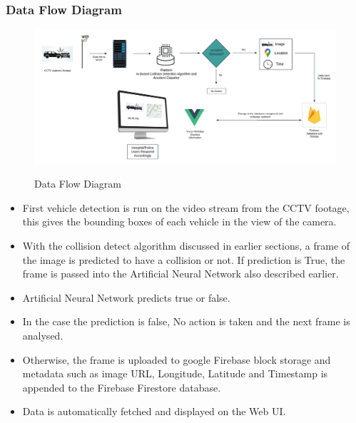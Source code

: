 \documentclass[ 12pt,a4paper,twocolumn,fleqn]{article}
\begin{document}
\begin{adjustwidth}{3.5em}{0pt}
\hspace{0.2cm}

\subsubsection{Data Flow Diagram}
\begin{figure}[H]
\begin{center}
    \hspace*{0.4in}
    \includegraphics[scale=0.3]{media/arch.png}
    \centering
    \\
  \caption{ Data Flow Diagram}
\end{center}
\end{figure}

\begin{itemize}
    \item First vehicle detection is run on the video stream from the CCTV footage, this gives the bounding boxes of each vehicle in the view of the camera.
    \item With the collision detect algorithm discussed in earlier sections, a frame of the image is predicted to have a collision or not.
    If prediction is True, the frame is passed into the Artificial Neural Network also described earlier.
    \item Artificial Neural Network predicts true or false.
    \item In the case the prediction is false, No action is taken and the next frame is analysed.
    \item Otherwise, the frame is uploaded to google Firebase block storage and metadata such as image URL, Longitude, Latitude and Timestamp is appended to the Firebase Firestore database.
    \item Data is automatically fetched and displayed on the Web UI. 
\end{itemize}



\newpage
  \pagestyle{fancy}
  

\end{adjustwidth}
\end{document}
